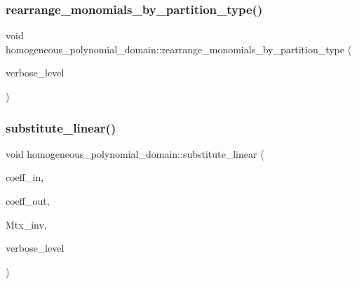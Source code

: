 \mbox{\label{classhomogeneous__polynomial__domain_af774250d5c1bd555c0ea55f2aaafad10}} 
\subsubsection{\texorpdfstring{rearrange\+\_\+monomials\+\_\+by\+\_\+partition\+\_\+type()}{rearrange\_monomials\_by\_partition\_type()}}
{\footnotesize\ttfamily void homogeneous\+\_\+polynomial\+\_\+domain\+::rearrange\+\_\+monomials\+\_\+by\+\_\+partition\+\_\+type (\begin{DoxyParamCaption}\item[{\mbox{\hyperlink{galois_8h_a09fddde158a3a20bd2dcadb609de11dc}{I\+NT}}}]{verbose\+\_\+level }\end{DoxyParamCaption})}

\mbox{\label{classhomogeneous__polynomial__domain_a236cbf545622995b80f5eb10a9f86c31}} 
\subsubsection{\texorpdfstring{substitute\+\_\+linear()}{substitute\_linear()}}
{\footnotesize\ttfamily void homogeneous\+\_\+polynomial\+\_\+domain\+::substitute\+\_\+linear (\begin{DoxyParamCaption}\item[{\mbox{\hyperlink{galois_8h_a09fddde158a3a20bd2dcadb609de11dc}{I\+NT}} $\ast$}]{coeff\+\_\+in,  }\item[{\mbox{\hyperlink{galois_8h_a09fddde158a3a20bd2dcadb609de11dc}{I\+NT}} $\ast$}]{coeff\+\_\+out,  }\item[{\mbox{\hyperlink{galois_8h_a09fddde158a3a20bd2dcadb609de11dc}{I\+NT}} $\ast$}]{Mtx\+\_\+inv,  }\item[{\mbox{\hyperlink{galois_8h_a09fddde158a3a20bd2dcadb609de11dc}{I\+NT}}}]{verbose\+\_\+level }\end{DoxyParamCaption})}

